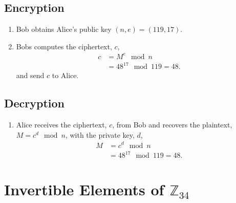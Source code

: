 \documentclass[11pt]{article} %
\begin{document}
\subsection{Encryption}
\begin{enumerate}
	\item Bob obtains Alice's public key $(n,e) = (119,17)$.
	\item Bobs computes the ciphertext, $c$,
		\begin{align*}
			c &= M^e \mod n \\
			  &= 48^{17} \mod 119 = 48.
		\end{align*}
		and send $c$ to Alice.
\end{enumerate}

\subsection{Decryption}
\begin{enumerate}
	\item Alice receives the ciphertext, $c$, from Bob and recovers the
		plaintext, $M = c^d \mod n$, with the private key, $d$,
		\begin{align*}
			M &= c^d \mod n \\
			  &= 48^{17} \mod 119 = 48.
		\end{align*}
\end{enumerate}

\section{Invertible Elements of $\mathbb{Z}_{34}$}
\end{document}
